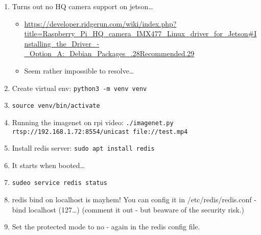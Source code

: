 \documentclass[a4paper,11pt]{article}
\begin{document}
\begin{enumerate}
	\item Turns out no HQ camera support on jetson\dots
		\begin{itemize}
			\item \url{https://developer.ridgerun.com/wiki/index.php?title=Raspberry_Pi_HQ_camera_IMX477_Linux_driver_for_Jetson#Installing_the_Driver_-_Option_A:_Debian_Packages_.28Recommended.29}
			\item Seem rather impossible to resolve\dots
		\end{itemize}
	\item Create virtual env: \texttt{python3 -m venv venv}
	\item \texttt{source venv/bin/activate}
	\item Running the imagenet on rpi video: \texttt{./imagenet.py rtsp://192.168.1.72:8554/unicast file://test.mp4}
	\item Install redis server: \texttt{sudo apt install redis}
	\item It starts when booted\dots
	\item \texttt{sudeo service redis status}
	\item redis bind on localhost is mayhem! You can config it in /etc/redis/redis.conf - bind  localhost (127\dots) (comment it out - but beaware of the security risk.)
	\item Set the protected mode to no - again in the redis config file.	
\end{enumerate}





%
%
\end{document}
